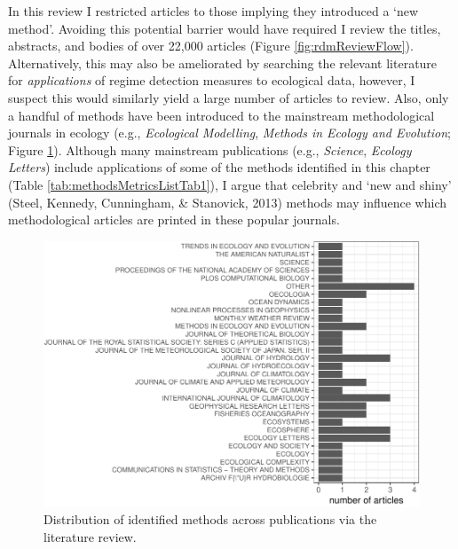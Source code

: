 \documentclass[12pt,twoside,openany]{reedthesis}
\begin{document}
In this review I restricted articles to those implying they introduced a `new method'. Avoiding this potential barrier would have required I review the titles, abstracts, and bodies of over 22,000 articles (Figure \ref{fig:rdmReviewFlow}). Alternatively, this may also be ameliorated by searching the relevant literature for \emph{applications} of regime detection measures to ecological data, however, I suspect this would similarly yield a large number of articles to review. Also, only a handful of methods have been introduced to the mainstream methodological journals in ecology (e.g., \emph{Ecological Modelling}, \emph{Methods in Ecology and Evolution}; Figure \ref{fig:jrnlDistFig}). Although many mainstream publications (e.g., \emph{Science}, \emph{Ecology Letters}) include applications of some of the methods identified in this chapter (Table \ref{tab:methodsMetricsListTab1}), I argue that celebrity and `new and shiny' (Steel, Kennedy, Cunningham, \& Stanovick, 2013) methods may influence which methodological articles are printed in these popular journals.
\begin{figure}
\centering
\includegraphics{_myDissertation_files/figure-latex/jrnlDistFig-1.pdf}
\caption{\label{fig:jrnlDistFig}Distribution of identified methods across publications via the literature review.}
\end{figure}
\end{document}
